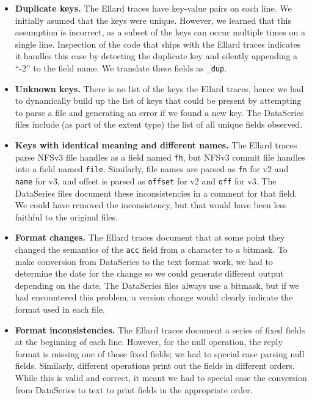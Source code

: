 \documentclass{article}
\begin{document}
\begin{itemize}

\item {\bf Duplicate keys.}  The Ellard traces have key-value pairs on
each line.  We initially asumed that the keys were unique.  However,
we learned that this assumption is incorrect, as a subset of the keys
can occur multiple times on a single line.  Inspection of the code
that ships with the Ellard traces indicates it handles this case by
detecting the duplicate key and silently appending a ``-2'' to the
field name.  We translate these fields as \texttt{\_dup}.

\item {\bf Unknown keys.} There is no list of the keys the Ellard
traces, hence we had to dynamically build up the list of keys that
could be present by attempting to parse a file and generating an error
if we found a new key.  The DataSeries files include (as part of the
extent type) the list of all unique fields observed.

\item {\bf Keys with identical meaning and different names.}  The
Ellard traces parse NFSv3 file handles as a field named \texttt{fh},
but NFSv3 commit file handles into a field named \texttt{file}.
Similarly, file names are parsed as \texttt{fn} for v2 and
\texttt{name} for v3, and offset is parsed as \texttt{offset} for v2
and \texttt{off} for v3. The DataSeries files document these
inconsistencies in a comment for that field.  We could have removed
the inconsistency, but that would have been less faithful to the
original files.

\item {\bf Format changes.}  The Ellard traces document that at some
point they changed the semantics of the \texttt{acc} field from a
character to a bitmask.  To make conversion from DataSeries to the
text format work, we had to determine the date for the change so we
could generate different output depending on the date.  The DataSeries
files always use a bitmask, but if we had encountered this problem, a
version change would clearly indicate the format used in each file.

\item {\bf Format inconsistencies.} The Ellard traces document a
series of fixed fields at the beginning of each line.  However, for
the null operation, the reply format is missing one of those fixed
fields; we had to special case parsing null fields.  Similarly,
different operations print out the fields in different orders.  While
this is valid and correct, it meant we had to special case the
conversion from DataSeries to text to print fields in the appropriate
order.


\end{itemize}
\end{document}
